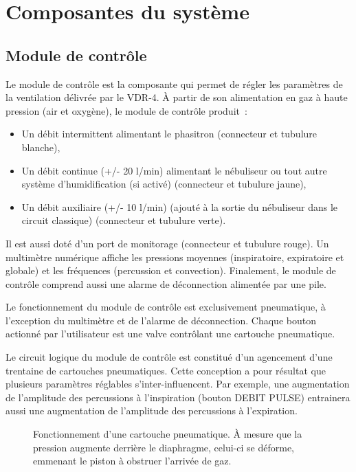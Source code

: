 \chapter{Composantes du système}

\section{Module de contrôle}

Le module de contrôle est la composante qui permet de régler les paramètres de la ventilation délivrée par le VDR-4. 
À partir de son alimentation en gaz à haute pression (air et oxygène), le module de contrôle produit :

\begin{itemize}
	\item Un débit intermittent alimentant le phasitron (connecteur et tubulure blanche),
	\item Un débit continue (+/- 20 l/min) alimentant le nébuliseur ou tout autre système d’humidification (si activé) (connecteur et tubulure jaune),
	\item Un débit auxiliaire (+/- 10 l/min) (ajouté à la sortie du nébuliseur dans le circuit classique) (connecteur et tubulure verte).
\end{itemize}

Il est aussi doté d’un port de monitorage (connecteur et tubulure rouge). Un multimètre numérique affiche les pressions moyennes (inspiratoire, expiratoire et globale) et les fréquences (percussion et convection). Finalement, le module de contrôle comprend aussi une alarme de déconnection alimentée par une pile.

Le fonctionnement du module de contrôle est exclusivement pneumatique, à l’exception du multimètre et de l’alarme de déconnection. Chaque bouton actionné par l’utilisateur est une valve contrôlant une cartouche pneumatique. 

Le circuit logique du module de contrôle est constitué d’un agencement d’une trentaine de cartouches pneumatiques. Cette conception a pour résultat que plusieurs paramètres réglables s’inter-influencent. Par exemple, une augmentation de l’amplitude des percussions à l’inspiration (bouton DEBIT PULSE) entrainera aussi une augmentation  de l’amplitude des percussions à l’expiration.

\begin{figure}[h]
	
\caption{Fonctionnement d'une cartouche pneumatique. À mesure que la pression augmente derrière le diaphragme, celui-ci se déforme, emmenant  le piston à obstruer l’arrivée de gaz.}
\end{figure}

